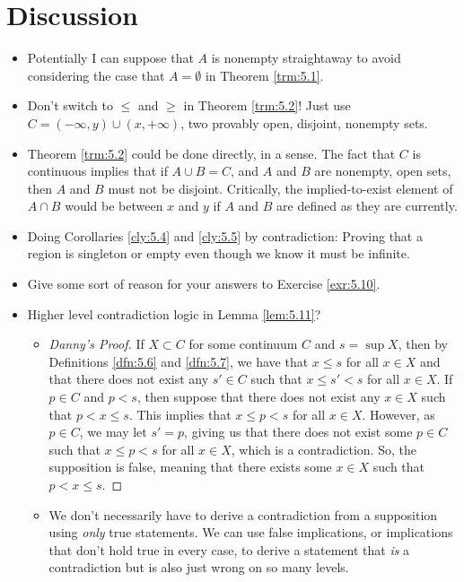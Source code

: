 \documentclass[titlepage]{report}
\begin{document}



\section{Discussion}
\begin{itemize}
    \item {}Potentially I can suppose that $A$ is nonempty straightaway to avoid considering the case that $A=\emptyset$ in Theorem \ref{trm:5.1}.
    \item Don't switch to $\leq$ and $\geq$ in Theorem \ref{trm:5.2}! Just use $C=(-\infty,y)\cup(x,+\infty)$, two provably open, disjoint, nonempty sets.
    \item Theorem \ref{trm:5.2} could be done directly, in a sense. The fact that $C$ is continuous implies that if $A\cup B=C$, and $A$ and $B$ are nonempty, open sets, then $A$ and $B$ must not be disjoint. Critically, the implied-to-exist element of $A\cap B$ would be between $x$ and $y$ if $A$ and $B$ are defined as they are currently.
    \item {}Doing Corollaries \ref{cly:5.4} and \ref{cly:5.5} by contradiction: Proving that a region is singleton or empty even though we know it must be infinite.
    \item Give some sort of reason for your answers to Exercise \ref{exr:5.10}.
    \item Higher level contradiction logic in Lemma \ref{lem:5.11}?
    \begin{itemize}
        \item 
        \begin{proof}[Danny's Proof]
            If $X\subset C$ for some continuum $C$ and $s=\sup X$, then by Definitions \ref{dfn:5.6} and \ref{dfn:5.7}, we have that $x\leq s$ for all $x\in X$ and that there does not exist any $s'\in C$ such that $x\leq s'<s$ for all $x\in X$. If $p\in C$ and $p<s$, then suppose that there does not exist any $x\in X$ such that $p<x\leq s$. This implies that $x\leq p<s$ for all $x\in X$. However, as $p\in C$, we may let $s'=p$, giving us that there does not exist some $p\in C$ such that $x\leq p<s$ for all $x\in X$, which is a contradiction. So, the supposition is false, meaning that there exists some $x\in X$ such that $p<x\leq s$.
        \end{proof}
        \item We don't necessarily have to derive a contradiction from a supposition using \emph{only} true statements. We can use false implications, or implications that don't hold true in every case, to derive a statement that \emph{is} a contradiction but is also just wrong on so many levels.

\end{itemize}
\end{itemize}
\end{document}
